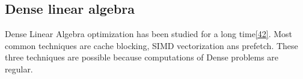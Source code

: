 \subsection{Dense linear algebra}

Dense Linear Algebra optimization has been studied for a long time\ref{42}.
Most common techniques are cache blocking, SIMD vectorization ans prefetch.
These three techniques are possible because computations of Dense problems
are regular.


